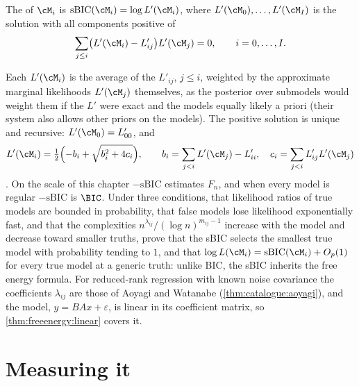 \begin{refsection}
\begin{definition}\label{def:freeenergy:sbic}
The  of $\cM_i$ is $\mathrm{sBIC}(\cM_i)=\log L'(\cM_i)$, where $L'(\cM_0),\dots,L'(\cM_I)$ is the solution with all components positive of
\[
\sum_{j\le i}\bigl(L'(\cM_i)-L'_{ij}\bigr)L'(\cM_j)=0,\qquad i=0,\dots,I.
\]
\end{definition}

Each $L'(\cM_i)$ is the average of the $L'_{ij}$, $j\le i$, weighted by the approximate marginal likelihoods $L'(\cM_j)$ themselves, as the posterior over submodels would weight them if the $L'$ were exact and the models equally likely a priori (their system also allows other priors on the models). The positive solution is unique and recursive: $L'(\cM_0)=L'_{00}$, and
\[
L'(\cM_i)=\tfrac12\Bigl(-b_i+\sqrt{b_i^2+4c_i}\Bigr),\qquad b_i=\sum_{j<i}L'(\cM_j)-L'_{ii},\quad c_i=\sum_{j<i}L'_{ij}L'(\cM_j)
\]
\parencite[Proposition~3.1]{DrtonPlummer2017}. On the scale of this chapter $-\mathrm{sBIC}$ estimates $F_n$, and when every model is regular $-\mathrm{sBIC}$ is $\BIC$. Under three conditions, that likelihood ratios of true models are bounded in probability, that false models lose likelihood exponentially fast, and that the complexities $n^{\lambda_{ij}}/(\log n)^{m_{ij}-1}$ increase with the model and decrease toward smaller truths, \textcite[Theorems~4.1 and~4.2]{DrtonPlummer2017} prove that the sBIC selects the smallest true model with probability tending to $1$, and that $\log L(\cM_i)=\mathrm{sBIC}(\cM_i)+O_p(1)$ for every true model at a generic truth: unlike BIC, the sBIC inherits the free energy formula. For reduced-rank regression with known noise covariance the coefficients $\lambda_{ij}$ are those of Aoyagi and Watanabe (\cref{thm:catalogue:aoyagi}), and the model, $y=BAx+\varepsilon$, is linear in its coefficient matrix, so \cref{thm:freeenergy:linear} covers it.

\section{Measuring it}\label{sec:freeenergy:measuring}


\end{refsection}
